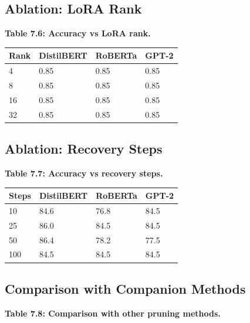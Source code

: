 {\subsection{Ablation: LoRA Rank}

\textbf{Table 7.6: Accuracy vs LoRA rank.}

\begin{table}[H]
\centering
\small
\begin{tabular}{llll}
\toprule
\textbf{Rank} & \textbf{DistilBERT} & \textbf{RoBERTa} & \textbf{GPT-2} \\
\midrule
4 & 0.85 & 0.85 & 0.85 \\
8 & 0.85 & 0.85 & 0.85 \\
16 & 0.85 & 0.85 & 0.85 \\
32 & 0.85 & 0.85 & 0.85 \\
\bottomrule
\end{tabular}
\end{table}

\subsection{Ablation: Recovery Steps}

\textbf{Table 7.7: Accuracy vs recovery steps.}

\begin{table}[H]
\centering
\small
\begin{tabular}{llll}
\toprule
\textbf{Steps} & \textbf{DistilBERT} & \textbf{RoBERTa} & \textbf{GPT-2} \\
\midrule
10 & 84.6 & 76.8 & 84.5 \\
25 & 86.0 & 84.5 & 84.5 \\
50 & 86.4 & 78.2 & 77.5 \\
100 & 84.5 & 84.5 & 84.5 \\
\bottomrule
\end{tabular}
\end{table}

\subsection{Comparison with Companion Methods}

\textbf{Table 7.8: Comparison with other pruning methods.}

}
